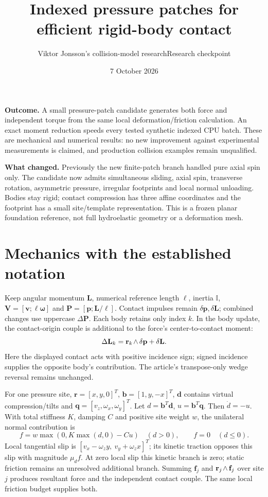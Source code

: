 \documentclass[10pt,a4paper]{article}
\title{Indexed pressure patches for efficient rigid-body contact}
\author{Viktor Jonsson's collision-model research\quad Research checkpoint}
\date{7 October 2026}
\newcommand{\rw}[1]{\mathord{#1\mkern2mu\wedge}}
\begin{document}
\maketitle
\textbf{Outcome.} A small pressure-patch candidate generates both force and
independent torque from the same local deformation/friction calculation. An exact
moment reduction speeds every tested synthetic indexed CPU batch. These are
mechanical and numerical results: no new improvement against experimental
measurements is claimed, and production collision examples remain unqualified.

\textbf{What changed.} Previously the new finite-patch branch handled pure axial
spin only. The candidate now admits simultaneous sliding, axial spin, transverse
rotation, asymmetric pressure, irregular footprints and local normal unloading.
Bodies stay rigid; contact compression has three affine coordinates and the
footprint has a small site/template representation. This is a frozen planar
foundation reference, not full hydroelastic geometry or a deformation mesh.

\section*{Mechanics with the established notation}
Keep angular momentum $\mathbf L$, numerical reference length $\ell$,
inertia $\mathbb I$, $\mathbf V=[\mathbf v;\ell\boldsymbol\omega]$ and
$\mathbf P=[\mathbf p;\mathbf L/\ell]$. Contact impulses remain
$\delta\mathbf p,\delta\mathbf L$; combined changes use uppercase $\Delta\mathbf P$.
Each body retains only index $k$. In the body update, the contact-origin couple is
additional to the force's center-to-contact moment:
\[
 \Delta\mathbf L_k=\rw{\mathbf r_k}\,\delta\mathbf p+\delta\mathbf L.
\]
Here the displayed contact acts with positive incidence sign; signed incidence
supplies the opposite body's contribution. The article's transpose-only
wedge reversal remains unchanged.

For one pressure site, $\mathbf r=[x,y,0]^T$,
$\mathbf b=[1,y,-x]^T$, $\mathbf d$ contains virtual compression/tilts and
$\mathbf q=[v_z,\omega_x,\omega_y]^T$. Let $d=\mathbf b^T\mathbf d$,
$u=\mathbf b^T\mathbf q$. Then $\dot d=-u$. With total stiffness $K$, damping $C$
and positive site weight $w$, the unilateral normal contribution is
\[
 f=w\max(0,K\max(d,0)-Cu)\quad(d>0),\qquad f=0\quad(d\leq0).
\]
Local tangential slip is $[v_x-\omega_z y,\ v_y+\omega_z x]^T$;
its kinetic traction opposes this slip with magnitude $\mu_d f$.
At zero local slip this kinetic branch is zero; static friction remains an
unresolved additional branch. Summing $\mathbf f_j$ and
$\rw{\mathbf r_j}\,\mathbf f_j$ over site $j$ produces resultant force and
the independent contact couple. The same local friction budget supplies both.
\end{document}
